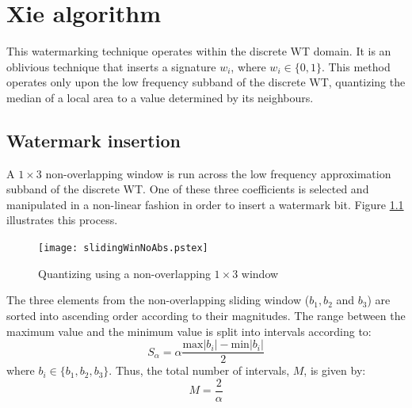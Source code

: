 \documentclass[12pt]{report}
\begin{document}
\chapter{Xie algorithm}
\label{chapter:xieAlg}

This watermarking technique \cite{BKX:xiePap} operates within the discrete WT domain. It 
is an oblivious technique that inserts a signature $w_{i}$, where $w_{i} \in \{0,1\}$.
This method operates only upon the low frequency subband of the discrete WT, quantizing 
the median of a local area to a value determined by its neighbours.

\section{Watermark insertion}
A $1 \times 3$ non-overlapping window is run across the low frequency approximation subband
of the discrete WT. 
One of these three coefficients is selected and manipulated in a non-linear fashion 
in order to insert a watermark bit. Figure \ref{slidingWin} illustrates this process.

\begin{figure}[htb]
	\begin{center}
		\texttt{[image: slidingWinNoAbs.pstex]}
		\caption{Quantizing using a non-overlapping $1 \times 3$ window}
		\label{slidingWin}
	\end{center}
\end{figure}

The three elements from the non-overlapping sliding window ($b_{1}, b_{2}$ and $b_{3}$) are sorted into 
ascending order according
to their magnitudes. The range between the maximum value and the minimum value is split into
intervals according to:
\begin{equation}
	S_{\alpha} = \alpha \frac{ \mbox{max}|b_{i}| - \mbox{min}|b_{i}| }{2}
\end{equation}
where $b_{i} \in \{b_{1}, b_{2}, b_{3}\}$. Thus, the total number of intervals, $M$, is given by:
\begin{equation}
	M = \frac{2}{\alpha}
\end{equation}
\end{document}
